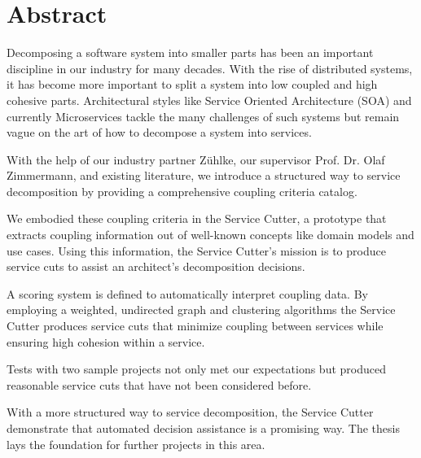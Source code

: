 \chapter{Abstract}

Decomposing a software system into smaller parts has been an important discipline in our industry for many decades. With the rise of distributed systems, it has become more important to split a system into low coupled and high cohesive parts. Architectural styles like Service Oriented Architecture (SOA) and currently Microservices tackle the many challenges of such systems but remain vague on the art of how to decompose a system into services.

With the help of our industry partner Zühlke, our supervisor Prof. Dr. Olaf Zimmermann, and existing literature, we introduce a structured way to service decomposition by providing a comprehensive coupling criteria catalog.

We embodied these coupling criteria in the Service Cutter, a prototype that extracts coupling information out of well-known concepts like domain models and use cases. Using this information, the Service Cutter’s mission is to produce service cuts to assist an architect’s decomposition decisions. 

A scoring system is defined to automatically interpret coupling data. By employing a weighted, undirected graph and clustering algorithms the Service Cutter produces service cuts that minimize coupling between services while ensuring high cohesion within a service. 

Tests with two sample projects not only met our expectations but produced reasonable service cuts that have not been considered before. 

With a more structured way to service decomposition, the Service Cutter demonstrate that automated decision assistance is a promising way. The thesis lays the foundation for further projects in this area. 
